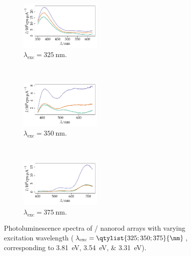 \documentclass[webedition,openright,titles,swedish,english]{LuaUUThesis}\usepackage[]{graphicx}\usepackage[]{xcolor}
\newenvironment{knitrout}{}{} %
\begin{document}
\begin{figure}[tbp]
\centering
\begin{subfigure}[b]{0.32\textwidth}
\centering
\begin{knitrout}\scriptsize
{}\color{fgcolor}

{\centering \includegraphics[width=1.57in]{figure/0501P-fig-photolum-325-1} 

}


\end{knitrout}
\caption{$\lambda_\text{exc}=\qty{325}{\nm}$.}
\label{fig:P01-photolum-325}
\end{subfigure}%
\,%
\begin{subfigure}[b]{0.32\textwidth}
\centering
\begin{knitrout}\scriptsize
{}\color{fgcolor}

{\centering \includegraphics[width=1.57in]{figure/0501P-fig-photolum-350-1} 

}


\end{knitrout}
\caption{$\lambda_\text{exc}=\qty{350}{\nm}$.}
\label{fig:P01-photolum-350}
\end{subfigure}%
\,%
\begin{subfigure}[b]{0.32\textwidth}
\centering
\begin{knitrout}\scriptsize
{}\color{fgcolor}

{\centering \includegraphics[width=1.57in]{figure/0501P-fig-photolum-375-1} 

}


\end{knitrout}
\caption{$\lambda_\text{exc}=\qty{375}{\nm}$.}
\label{fig:P01-photolum-375}
\end{subfigure}%
\caption[Photoluminescence spectra of ZnO/CdS nanorod arrays]{%
   Photoluminescence spectra of / nanorod arrays with varying
   excitation wavelength ($\lambda_\text{exc}=\qtylist{325;350;375}{\nm}$,
   corresponding to
   \qtylist{3.81;3.54;3.31}{\eV}).}
\label{fig:P01-photolum}
\end{figure}
\end{document}
